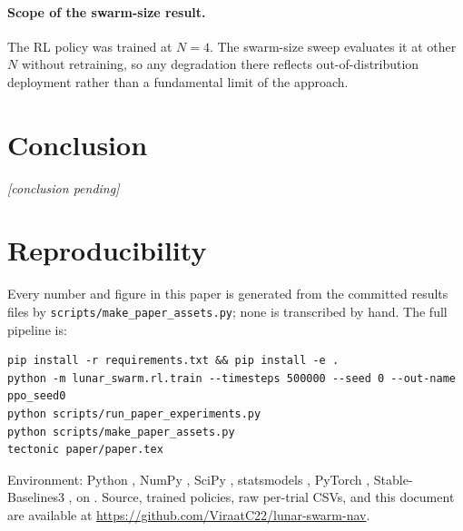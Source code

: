\documentclass[11pt]{article}
\begin{document}
\paragraph{Scope of the swarm-size result.}
The RL policy was trained at $N = 4$. The swarm-size sweep evaluates it at
other $N$ without retraining, so any degradation there reflects
out-of-distribution deployment rather than a fundamental limit of the approach.

\section{Conclusion}

\textit{[conclusion pending]}

\section*{Reproducibility}

Every number and figure in this paper is generated from the committed results
files by \texttt{scripts/make\_paper\_assets.py}; none is transcribed by hand.
The full pipeline is:
\begin{verbatim}
pip install -r requirements.txt && pip install -e .
python -m lunar_swarm.rl.train --timesteps 500000 --seed 0 --out-name ppo_seed0
python scripts/run_paper_experiments.py
python scripts/make_paper_assets.py
tectonic paper/paper.tex
\end{verbatim}
Environment: Python \VerPython, NumPy \VerNumpy, SciPy \VerScipy,
statsmodels \VerStatsmodels, PyTorch \VerTorch, Stable-Baselines3 \VerSB,
on \HostCPU. Source, trained policies, raw per-trial CSVs, and this document
are available at \url{https://github.com/ViraatC22/lunar-swarm-nav}.
\end{document}
